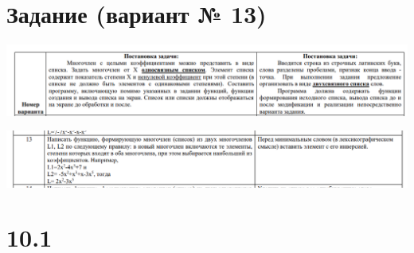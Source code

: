 \documentclass[12pt]{article}
\begin{document}
	\newpage
	
	
	\section{Задание (вариант № 13)}
	

	\includegraphics[width=1.1\linewidth]{images/task1}
	
	\includegraphics[width=1.1\linewidth]{images/task}

	
	\newpage
	
	\section{10.1}
	
\end{document}
